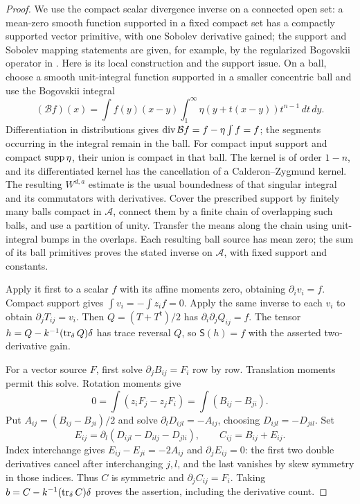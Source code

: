 \begin{proof}
We use the compact scalar divergence inverse on a connected open
set: a mean-zero smooth function supported in a fixed compact set
has a compactly supported vector primitive, with one Sobolev
derivative gained; the support and Sobolev mapping statements are
given, for example, by the regularized Bogovskii operator in
\cite[Section~3.1, Equation~(3.13), Theorem~3.2,
Corollaries~3.3--3.4, Remark~3.5,
and Proposition~4.1(ii)]{CostabelMcIntosh2010}.
Here is its local construction and the support
issue.  On a ball, choose a smooth unit-integral function supported
in a smaller concentric ball and use the Bogovskii integral
\[
 (\mathcal Bf)(x)=\int f(y)(x-y)
          \int_1^\infty\eta(y+t(x-y))t^{n-1}\,dt\,dy.
\]
Differentiation in distributions gives
$\operatorname{div}\mathcal Bf=f-\eta\int f=f$; the segments occurring in the
integral remain in the ball.  For compact input support and compact
$\operatorname{supp}\eta$, their union is compact in that ball.  The kernel is of
order $1-n$, and its differentiated kernel has the cancellation
of a Calderon--Zygmund kernel.  The resulting $W^{d,a}$ estimate
is the usual boundedness of that singular integral and its
commutators with derivatives.  Cover the prescribed support by
finitely many balls compact in $\mathcal A$, connect them by a
finite chain of overlapping such balls, and use a partition of
unity.  Transfer the means along the chain using unit-integral
bumps in the overlaps.  Each resulting ball source has mean zero;
the sum of its ball primitives proves the stated inverse on
$\mathcal A$, with fixed support and constants.

Apply it first to a scalar $f$ with its affine moments zero,
obtaining $\partial_iv_i=f$.  Compact support gives
$\int v_i=-\int z_i f=0$.  Apply the same inverse to each $v_i$
to obtain $\partial_jT_{ij}=v_i$.  Then
$Q=(T+T^{\mathsf t})/2$ has $\partial_i\partial_jQ_{ij}=f$.
The tensor $h=Q-k^{-1}(\operatorname{tr}_\delta Q)\delta$ has trace reversal
$Q$, so $\mathsf S(h)=f$ with the asserted two-derivative gain.

For a vector source $F$, first solve $\partial_jB_{ij}=F_i$
row by row.  Translation moments permit this solve.  Rotation
moments give
\[
 0=\int(z_iF_j-z_jF_i)=\int(B_{ij}-B_{ji}).
\]
Put $A_{ij}=(B_{ij}-B_{ji})/2$ and solve
$\partial_lD_{ijl}=-A_{ij}$, choosing $D_{ijl}=-D_{jil}$.
Set
\[
 E_{ij}=\partial_l(D_{ijl}-D_{ilj}-D_{jli}),\qquad C_{ij}=B_{ij}+E_{ij}.
\]
Index interchange gives $E_{ij}-E_{ji}=-2A_{ij}$ and
$\partial_jE_{ij}=0$: the first two double derivatives cancel
after interchanging $j,l$, and the last vanishes by skew symmetry
in those indices.  Thus $C$ is symmetric and $\partial_jC_{ij}=F_i$.
Taking $b=C-k^{-1}(\operatorname{tr}_\delta C)\delta$ proves the assertion,
including the derivative count.


\end{proof}
